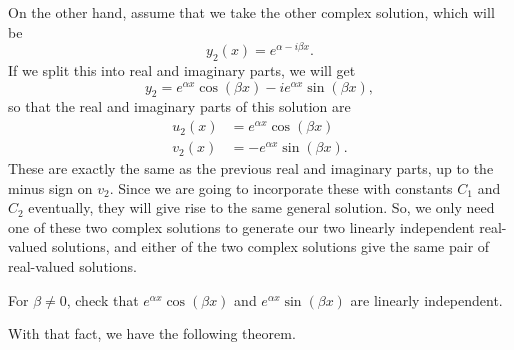 On the other hand, assume that we take the other complex solution, which will be  
\begin{equation*}
y_2(x) = e^{\alpha - i\beta x}.
\end{equation*}
If we split this into real and imaginary parts, we will get 
\begin{equation*}
y_2  = e^{\alpha x} \cos (\beta x) - i e^{\alpha x} \sin (\beta x),
\end{equation*}
so that the real and imaginary parts of this solution are
\begin{equation*}
\begin{split}
u_2(x) &= e^{\alpha x} \cos (\beta x) \\
v_2(x) &= -e^{\alpha x} \sin (\beta x).
\end{split}
\end{equation*}
These are exactly the same as the previous real and imaginary parts, up to the minus sign on $v_2$. Since we are going to incorporate these with constants $C_1$ and $C_2$ eventually, they will give rise to the same general solution. So, we only need one of these two complex solutions to generate our two linearly independent real-valued solutions, and either of the two complex solutions give the same pair of real-valued solutions.

\begin{exercise}
For $\beta \neq 0$, check that $e^{\alpha x} \cos (\beta x)$ and $e^{\alpha x} \sin (\beta x)$ are linearly independent.
\end{exercise}

With that fact, we have the following theorem. 

%
%

